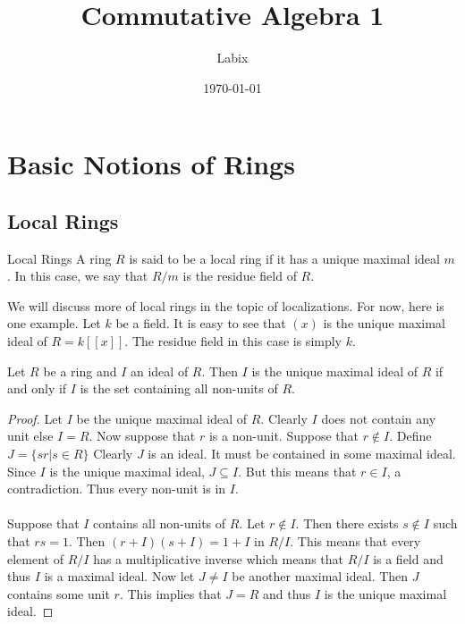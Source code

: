\documentclass[a4paper]{article}
\title{Commutative Algebra 1}
\author{Labix}
\date{\today}
\begin{document}
\maketitle
\begin{abstract}
\end{abstract}
\pagebreak
\tableofcontents
\pagebreak

\pagebreak
\section{Basic Notions of Rings}
\subsection{Local Rings}
\begin{defn}{Local Rings}{} A ring $R$ is said to be a local ring if it has a unique maximal ideal $m$. In this case, we say that $R/m$ is the residue field of $R$. 
\end{defn}

We will discuss more of local rings in the topic of localizations. For now, here is one example. Let $k$ be a field. It is easy to see that $(x)$ is the unique maximal ideal of $R=k[[x]]$. The residue field in this case is simply $k$. 

\begin{prp}{}{} Let $R$ be a ring and $I$ an ideal of $R$. Then $I$ is the unique maximal ideal of $R$ if and only if $I$ is the set containing all non-units of $R$. \tcbline
\begin{proof}
Let $I$ be the unique maximal ideal of $R$. Clearly $I$ does not contain any unit else $I=R$. Now suppose that $r$ is a non-unit. Suppose that $r\notin I$. Define $J=\{sr|s\in R\}$ Clearly $J$ is an ideal. It must be contained in some maximal ideal. Since $I$ is the unique maximal ideal, $J\subseteq I$. But this means that $r\in I$, a contradiction. Thus every non-unit is in $I$. \\~\\
Suppose that $I$ contains all non-units of $R$. Let $r\notin I$. Then there exists $s\notin I$ such that $rs=1$. Then $(r+I)(s+I)=1+I$ in $R/I$. This means that every element of $R/I$ has a multiplicative inverse which means that $R/I$ is a field and thus $I$ is a maximal ideal. Now let $J\neq I$ be another maximal ideal. Then $J$ contains some unit $r$. This implies that $J=R$ and thus $I$ is the unique maximal ideal. 
\end{proof}
\end{prp}
\end{document}

